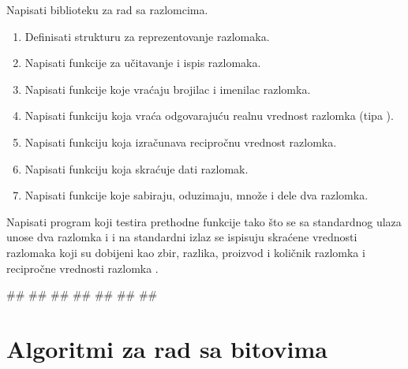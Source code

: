 \begin{Exercise}[label=004] %
Napisati biblioteku za rad sa razlomcima.

  \begin{enumerate}

  \item Definisati strukturu za reprezentovanje razlomaka.
  \item Napisati funkcije za učitavanje i ispis razlomaka.
  \item Napisati funkcije koje vraćaju brojilac i imenilac razlomka.
  \item Napisati funkciju koja vraća odgovarajuću realnu vrednost razlomka (tipa ).
  \item Napisati funkciju koja izračunava recipročnu vrednost
    razlomka.
  \item Napisati funkciju koja skraćuje dati razlomak.
  \item Napisati funkcije koje sabiraju, oduzimaju, množe i dele
    dva razlomka.
\end{enumerate}

Napisati program koji testira prethodne funkcije tako što se sa standardnog ulaza unose dva razlomka  i  i na standardni izlaz se ispisuju skraćene vrednosti razlomaka koji su dobijeni kao zbir, razlika, proizvod i količnik razlomka  i recipročne vrednosti razlomka .


\begin{maxitest}
\begin{upotreba}{1}
#\naslovInt#
##
##
##
##
##
##
\end{upotreba}
\end{maxitest}



\end{Exercise}

\section{Algoritmi za rad sa bitovima}

